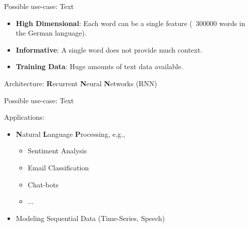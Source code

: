 

\begin{frame} {Possible use-case: Text}


\begin{itemize}
\item \textbf{High Dimensional}: Each word can be a single feature (~300000 words in the German language).
\vspace{.5cm}
\item \textbf{Informative}: A single word does not provide much context.
\vspace{.5cm}
\item \textbf{Training Data}: Huge amounts of text data available.
\end{itemize}
\vspace{1.5cm}
Architecture: \textbf{R}ecurrent \textbf{N}eural \textbf{N}etworks (RNN)

\end{frame}


\begin{frame} {Possible use-case: Text}

Applications:
\vspace{.7cm}
\begin{itemize}
\item \textbf{N}atural \textbf{L}anguage \textbf{P}rocessing, e.g.,
\begin{itemize}
\item Sentiment Analysis
\vspace{.3cm}
\item Email Classification
\vspace{.3cm}
\item Chat-bots
\vspace{.3cm}
\item $...$
\end{itemize}
\vspace{.7cm}
\item Modeling Sequential Data (Time-Series, Speech)
\end{itemize}

\end{frame}

